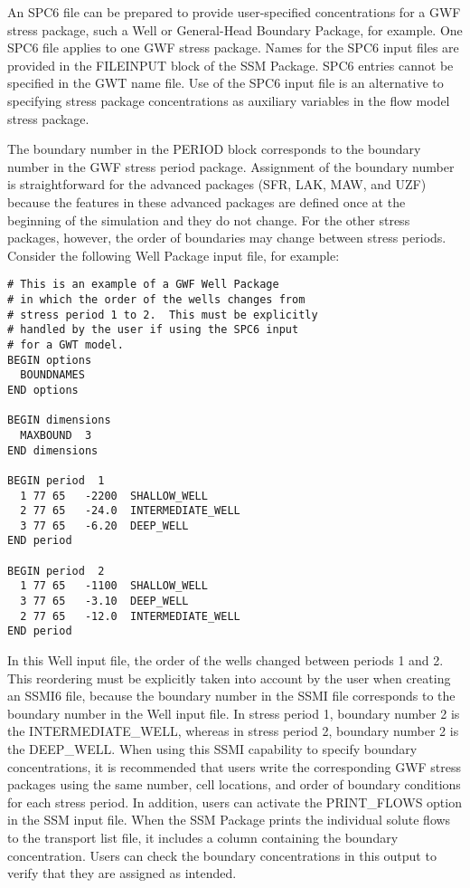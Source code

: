 An SPC6 file can be prepared to provide user-specified concentrations for a GWF stress package, such a Well or General-Head Boundary Package, for example.  One SPC6 file applies to one GWF stress package.  Names for the SPC6 input files are provided in the FILEINPUT block of the SSM Package.  SPC6 entries cannot be specified in the GWT name file.  Use of the SPC6 input file is an alternative to specifying stress package concentrations as auxiliary variables in the flow model stress package.  

The boundary number in the PERIOD block corresponds to the boundary number in the GWF stress period package.  Assignment of the boundary number is straightforward for the advanced packages (SFR, LAK, MAW, and UZF) because the features in these advanced packages are defined once at the beginning of the simulation and they do not change.  For the other stress packages, however, the order of boundaries may change between stress periods.  Consider the following Well Package input file, for example:

\begin{verbatim}
# This is an example of a GWF Well Package
# in which the order of the wells changes from
# stress period 1 to 2.  This must be explicitly
# handled by the user if using the SPC6 input
# for a GWT model.
BEGIN options
  BOUNDNAMES
END options

BEGIN dimensions
  MAXBOUND  3
END dimensions

BEGIN period  1
  1 77 65   -2200  SHALLOW_WELL
  2 77 65   -24.0  INTERMEDIATE_WELL
  3 77 65   -6.20  DEEP_WELL
END period

BEGIN period  2
  1 77 65   -1100  SHALLOW_WELL
  3 77 65   -3.10  DEEP_WELL
  2 77 65   -12.0  INTERMEDIATE_WELL
END period
\end{verbatim}

\noindent In this Well input file, the order of the wells changed between periods 1 and 2.  This reordering must be explicitly taken into account by the user when creating an SSMI6 file, because the boundary number in the SSMI file corresponds to the boundary number in the Well input file.  In stress period 1, boundary number 2 is the INTERMEDIATE\_WELL, whereas in stress period 2, boundary number 2 is the DEEP\_WELL.  When using this SSMI capability to specify boundary concentrations, it is recommended that users write the corresponding GWF stress packages using the same number, cell locations, and order of boundary conditions for each stress period.   In addition, users can activate the PRINT\_FLOWS option in the SSM input file.  When the SSM Package prints the individual solute flows to the transport list file, it includes a column containing the boundary concentration.  Users can check the boundary concentrations in this output to verify that they are assigned as intended.


